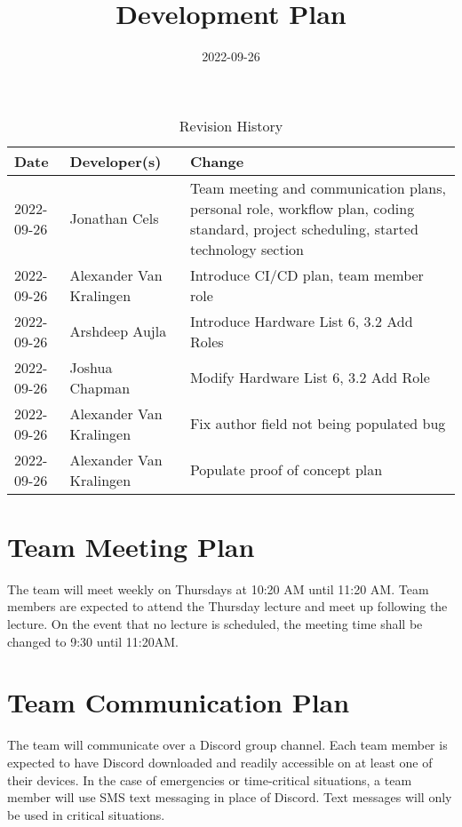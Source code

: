 \documentclass{article}
\title{Development Plan\\\progname}
\author{\authname}
\date{2022-09-26}
\begin{document}
\begin{table}[hp]
\caption{Revision History} \label{TblRevisionHistory}
\begin{tabularx}{\textwidth}{llX}
\toprule
\textbf{Date} & \textbf{Developer(s)} & \textbf{Change}\\
\midrule
2022-09-26 & Jonathan Cels & Team meeting and communication plans, personal role, workflow plan, coding standard, project scheduling, started technology section\\
2022-09-26 & Alexander Van Kralingen & Introduce CI/CD plan, team member role\\
2022-09-26 & Arshdeep Aujla & Introduce Hardware List 6, 3.2 Add Roles\\
2022-09-26 & Joshua Chapman & Modify Hardware List 6, 3.2 Add Role\\
2022-09-26 & Alexander Van Kralingen & Fix author field not being populated bug\\
2022-09-26 & Alexander Van Kralingen & Populate proof of concept plan\\
\bottomrule
\end{tabularx}
\end{table}

\newpage

\maketitle

\section{Team Meeting Plan}
{The team will meet weekly on Thursdays at 10:20 AM until 11:20 AM. 
Team members are expected to attend the Thursday lecture and meet up following the lecture. 
On the event that no lecture is scheduled, the meeting time shall be changed to 9:30 until 11:20AM.}

\medskip
{}

\section{Team Communication Plan}
{The team will communicate over a Discord group channel. Each team member is expected to have Discord downloaded and readily accessible on at least one of their devices. 
In the case of emergencies or time-critical situations, a team member will use SMS text messaging in place of Discord. Text messages will only be used in critical situations.}
\end{document}
